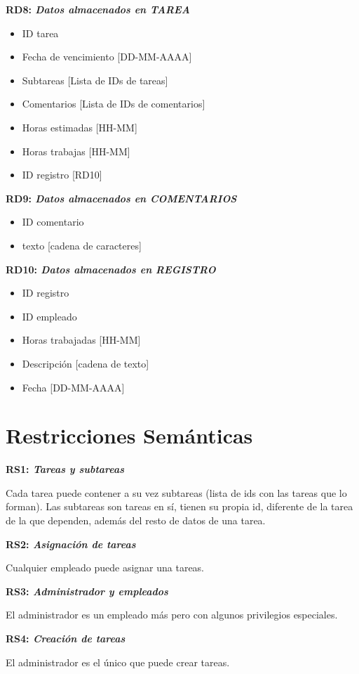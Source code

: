 \documentclass[paper=a4, fontsize=11pt, spanish]{scrartcl}
\begin{document}
\setlength{\parindent}{0em}
\textbf{RD8: \textit{Datos almacenados en TAREA}}
\setlength{\parindent}{2em}
\begin{itemize}
\item ID tarea
\item Fecha de vencimiento [DD-MM-AAAA]
\item Subtareas [Lista de IDs de tareas]
\item Comentarios [Lista de IDs de comentarios]
\item Horas estimadas [HH-MM]
\item Horas trabajas [HH-MM]
\item ID registro [RD10]
\end{itemize}

\setlength{\parindent}{0em}
\textbf{RD9: \textit{Datos almacenados en COMENTARIOS}}
\setlength{\parindent}{2em}
\begin{itemize}
\item ID comentario
\item texto [cadena de caracteres]
\end{itemize}

\setlength{\parindent}{0em}
\textbf{RD10: \textit{Datos almacenados en REGISTRO}}
\setlength{\parindent}{2em}
\begin{itemize}
\item ID registro
\item ID empleado
\item Horas trabajadas [HH-MM]
\item Descripción [cadena de texto]
\item Fecha [DD-MM-AAAA]
\end{itemize}

\section{Restricciones Semánticas}
\setlength{\parindent}{0em}
\textbf{RS1: \textit{Tareas y subtareas}}
\setlength{\parindent}{2em}

Cada tarea puede contener a su vez subtareas (lista de ids con las tareas que lo forman). Las subtareas son tareas en sí, tienen su propia id, diferente de la tarea de la que dependen, además del resto de datos de una tarea.

\setlength{\parindent}{0em}
\textbf{RS2: \textit{Asignación de tareas}}
\setlength{\parindent}{2em}

Cualquier empleado puede asignar una tareas.

\setlength{\parindent}{0em}
\textbf{RS3: \textit{Administrador y empleados}}
\setlength{\parindent}{2em}

El administrador es un empleado más pero con algunos privilegios especiales.

\setlength{\parindent}{0em}
\textbf{RS4: \textit{Creación de tareas}}
\setlength{\parindent}{2em}

El administrador es el único que puede crear tareas.
\end{document}
